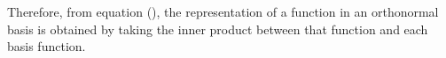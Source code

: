 \documentclass{article}
\newcommand{\B}[1]{\boldsymbol{#1}}
\newtheorem{theorem}{Theorem}[section]
\theoremstyle{definition}
\newtheorem{definition}{Definition}[section]
\theoremstyle{remark}
\begin{document}
Therefore, from equation (), the representation of a function in an orthonormal
basis is obtained by taking the inner product between that function and each basis function.










\end{document}
